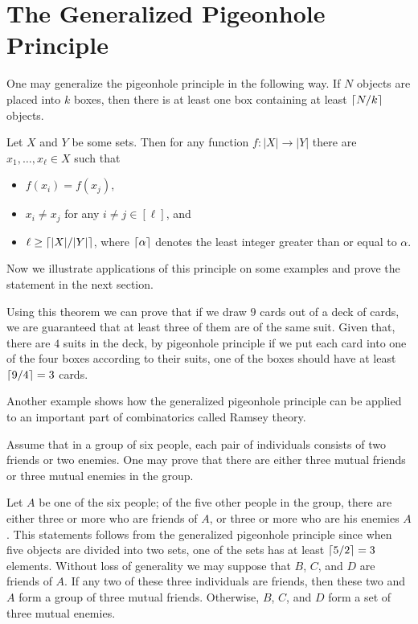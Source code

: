\section{The Generalized Pigeonhole Principle}
One may generalize the pigeonhole principle in the following way.
If $N$ objects are placed into $k$ boxes, then there is at least one box
containing at least $\left\lceil {N / k} \right\rceil$ objects.
\begin{theorem}
\label{theorem:generalized-pigeonhole-principle}
  Let $X$ and $Y$ be some sets. Then for any function $f : |X| \to |Y|$ there
  are $x_1, \dots, x_\ell \in X$ such that
  \begin{itemize}
    \item $f(x_i) = f(x_j)$,
    \item $x_i \neq x_j$ for any $i \neq j \in [\ell]$, and
    \item $\ell \ge \left\lceil {|X| / |Y|} \right\rceil$, where $\left\lceil {\alpha} \right\rceil$ denotes the least
      integer greater than or equal to $\alpha$.
  \end{itemize}
\end{theorem}

Now we illustrate applications of this principle on some examples and prove the
statement in the next section.

Using this theorem we can prove that if we draw $9$ cards out of a deck of
cards, we are guaranteed that at least three of them are of the same suit.
Given that, there are $4$ suits in the deck, by pigeonhole principle if we put each card into
one of the four boxes according to their suits, one of the boxes should have
at least $\left\lceil {9 / 4} \right\rceil = 3$ cards.

Another example shows how the generalized pigeonhole principle can be applied
to an important part of combinatorics called Ramsey theory.

Assume that in a group of six people, each pair of individuals consists of two
friends or two enemies. One may prove that there are either three mutual
friends or three mutual enemies in the group.

Let $A$ be one of the six people; of the five other people in the group, there
are either three or more who are friends of $A$, or three or more who are
his enemies $A$. This statements follows from the generalized pigeonhole
principle since when five objects are divided into two sets, one of the sets
has at least $\left\lceil {5 / 2} \right\rceil = 3$ elements. Without loss of generality we may
suppose that $B$, $C$, and $D$ are friends of $A$. If any two of these three
individuals are friends, then these two and $A$ form a group of three mutual
friends. Otherwise, $B$, $C$, and $D$ form a set of three mutual enemies.

